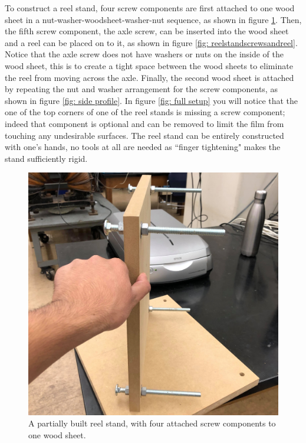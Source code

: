 \documentclass[12pt]{article} %
\begin{document}
To construct a reel stand, four screw components are first attached to one wood sheet in a nut-washer-woodsheet-washer-nut sequence, as shown in figure \ref{fig: reelstand4screws}. Then, the fifth screw component, the axle screw, can be inserted into the wood sheet and a reel can be placed on to it, as shown in figure \ref{fig: reelstandscrewsandreel}. Notice that the axle screw does not have washers or nuts on the inside of the wood sheet, this is to create a tight space between the wood sheets to eliminate the reel from moving across the axle. Finally, the second wood sheet is attached by repeating the nut and washer arrangement for the screw components, as shown in figure \ref{fig: side profile}. In figure \ref{fig: full setup} you will notice that the one of the top corners of one of the reel stands is missing a screw component; indeed that component is optional and can be removed to limit the film from touching any undesirable surfaces. The reel stand can be entirely constructed with one's hands, no tools at all are needed as ``finger tightening" makes the stand sufficiently rigid.
\begin{figure}[H]
    \centering
    \includegraphics[width=0.7\linewidth]{Images/Reel stand images/reelstand4screws.jpg}
    \caption{A partially built reel stand, with four attached screw components to one wood sheet.}
    \label{fig: reelstand4screws}
\end{figure}
\end{document}
